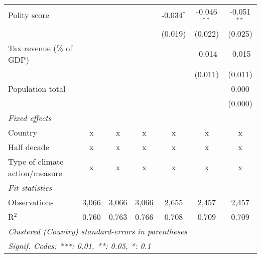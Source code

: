 \begin{tabular}{lcccccc}
   Polity score                                                       &         &              &              & -0.034$^{*}$  & -0.046$^{**}$ & -0.051$^{**}$\\   
                                                                      &         &              &              & (0.019)       & (0.022)       & (0.025)\\   
   Tax revenue (\% of GDP)                                            &         &              &              &               & -0.014        & -0.015\\   
                                                                      &         &              &              &               & (0.011)       & (0.011)\\   
   Population total                                                   &         &              &              &               &               & 0.000\\   
                                                                      &         &              &              &               &               & (0.000)\\   
   \emph{Fixed effects}\\
   Country                                                            & x       & x            & x            & x             & x             & x\\  
   Half decade                                                        & x       & x            & x            & x             & x             & x\\  
   Type of climate action/measure                                     & x       & x            & x            & x             & x             & x\\  
   \midrule \emph{Fit statistics}\\
   Observations                                                       & 3,066   & 3,066        & 3,066        & 2,655         & 2,457         & 2,457\\  
   R$^2$                                                              & 0.760   & 0.763        & 0.766        & 0.708         & 0.709         & 0.709\\  
   \midrule
   \multicolumn{7}{l}{\emph{Clustered (Country) standard-errors in parentheses}}\\
   \multicolumn{7}{l}{\emph{Signif. Codes: ***: 0.01, **: 0.05, *: 0.1}}\\
\end{tabular}
\par\endgroup


